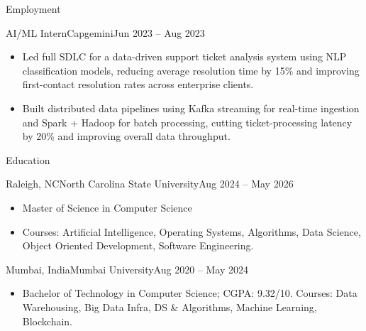 \documentclass[]{mcdowellcv}
\begin{document}
\begin{cvsection}{Employment}
  \begin{cvsubsection}{AI/ML Intern}{Capgemini}{Jun 2023 -- Aug 2023}
    \begin{itemize}
      \item Led full SDLC for a data-driven support ticket analysis system using NLP classification models, reducing average resolution time by 15\% and improving first-contact resolution rates across enterprise clients.
      \item Built distributed data pipelines using Kafka streaming for real-time ingestion and Spark + Hadoop for batch processing, cutting ticket-processing latency by 20\% and improving overall data throughput.
    \end{itemize}
    \vspace{-1.5pt}
  \end{cvsubsection}
\end{cvsection}

\begin{cvsection}{Education}
  \begin{cvsubsection}{Raleigh, NC}{North Carolina State University}{Aug 2024 -- May 2026}
    \begin{itemize}
      \item Master of Science in Computer Science
      \item Courses: Artificial Intelligence, Operating Systems, Algorithms, Data Science, Object Oriented Development, Software Engineering.
    \end{itemize}
    \vspace{-1.5pt}
  \end{cvsubsection}

  \begin{cvsubsection}{Mumbai, India}{Mumbai University}{Aug 2020 -- May 2024}
    \begin{itemize}
      \item Bachelor of Technology in Computer Science; CGPA: 9.32/10. Courses: Data Warehousing, Big Data Infra, DS \& Algorithms, Machine Learning, Blockchain.
    \end{itemize}
    \vspace{-1.5pt}
  \end{cvsubsection}
\end{cvsection}
\end{document}
